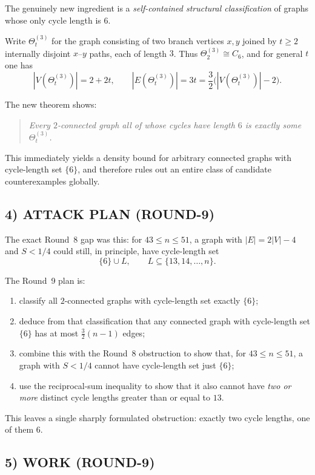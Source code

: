 The genuinely new ingredient is a \emph{self-contained structural classification} of graphs whose only cycle length is $6$.

Write $\Theta_t^{(3)}$ for the graph consisting of two branch vertices $x,y$ joined by $t\ge 2$ internally disjoint $x$--$y$ paths, each of length $3$.
Thus $\Theta_2^{(3)}\cong C_6$, and for general $t$ one has
\[
|V(\Theta_t^{(3)})|=2+2t,
\qquad
|E(\Theta_t^{(3)})|=3t=\frac32\bigl(|V(\Theta_t^{(3)})|-2\bigr).
\]

The new theorem shows:
\begin{quote}
\emph{Every $2$-connected graph all of whose cycles have length $6$ is exactly some $\Theta_t^{(3)}$.}
\end{quote}
This immediately yields a density bound for arbitrary connected graphs with cycle-length set $\{6\}$, and therefore rules out an entire class of candidate counterexamples globally.

\subsection*{4) ATTACK PLAN (ROUND-9)}

The exact Round~8 gap was this: for $43\le n\le 51$, a graph with $|E|=2|V|-4$ and $S<1/4$ could still, in principle, have cycle-length set
\[
\{6\}\cup L,
\qquad L\subseteq \{13,14,\dots,n\}.
\]

The Round~9 plan is:
\begin{enumerate}
\item classify all $2$-connected graphs with cycle-length set exactly $\{6\}$;
\item deduce from that classification that any connected graph with cycle-length set $\{6\}$ has at most $\frac32(n-1)$ edges;
\item combine this with the Round~8 obstruction to show that, for $43\le n\le 51$, a graph with $S<1/4$ cannot have cycle-length set just $\{6\}$;
\item use the reciprocal-sum inequality to show that it also cannot have \emph{two or more} distinct cycle lengths greater than or equal to $13$.
\end{enumerate}

This leaves a single sharply formulated obstruction: exactly two cycle lengths, one of them $6$.

\subsection*{5) WORK (ROUND-9)}


